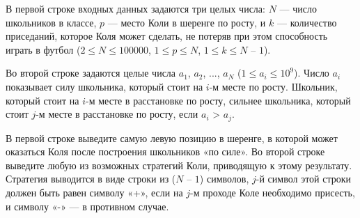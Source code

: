\begin{problem}
\InputFile

В первой строке входных данных задаются три целых числа: $N$ — число школьников в классе, $p$ — место Коли в шеренге по росту, и $k$ — количество приседаний, которое Коля может сделать, не потеряв при этом способность играть в футбол ($2 \le N \le 100 000$, $1 \le p \le N$, $1 \le k \le N$ – $1$).

Во второй строке задаются целые числа $a_1$, $a_2$, $...$, $a_N$ ($1 \le a_i \le 10^9$). Число $a_i$ показывает силу школьника, который стоит на $i$-м месте по росту. Школьник, который стоит на $i$-м месте в расстановке по росту, сильнее школьника, который стоит $j$-м месте в расстановке по росту, если $a_i$ > $a_j$.

\OutputFile

В первой строке выведите самую левую позицию в шеренге, в которой может оказаться Коля после построения школьников «по силе». Во второй строке выведите любую из возможных стратегий Коли, приводящую к этому результату. Стратегия выводится в виде строки из ($N$ – $1$) символов, $j$-й символ этой строки должен быть равен символу «+», если на $j$-м проходе Коле необходимо присесть, и символу «-» — в противном случае.

\Examples

\begin{example}
%
\end{example}
\end{problem}
